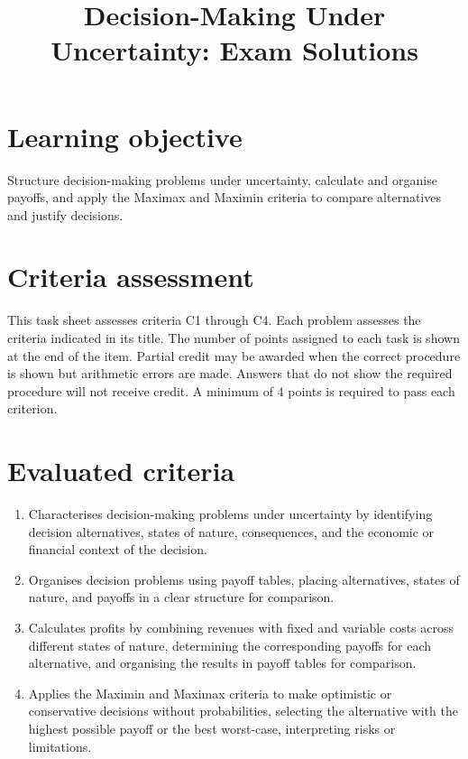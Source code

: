 \makeatletter
{}
\makeatother



\title{Decision-Making Under Uncertainty: Exam Solutions}
\author{}
\date{}


	\maketitle
	\vspace{-2cm}
	\setcounter{tocdepth}{1}
	\setcounter{secnumdepth}{2}
	\label{toc}
	\tableofcontents
	
	\section*{Learning objective}
	Structure decision-making problems under uncertainty, calculate and organise payoffs, and apply the Maximax and Maximin criteria to compare alternatives and justify decisions.
	
	\section*{Criteria assessment}
	This task sheet assesses criteria C1 through C4. Each problem assesses the criteria indicated in its title. The number of points assigned to each task is shown at the end of the item. Partial credit may be awarded when the correct procedure is shown but arithmetic errors are made. Answers that do not show the required procedure will not receive credit. A minimum of 4 points is required to pass each criterion.
	
	\section*{Evaluated criteria}
	\begin{enumerate}[label=\textbf{C\arabic*}]
		\item Characterises decision-making problems under uncertainty by identifying decision alternatives, states of nature, consequences, and the economic or financial context of the decision.
		\item Organises decision problems using payoff tables, placing alternatives, states of nature, and payoffs in a clear structure for comparison.
		\item Calculates profits by combining revenues with fixed and variable costs across different states of nature, determining the corresponding payoffs for each alternative, and organising the results in payoff tables for comparison.
		\item Applies the Maximin and Maximax criteria to make optimistic or conservative decisions without probabilities, selecting the alternative with the highest possible payoff or the best worst-case, interpreting risks or limitations.
	\end{enumerate}
	
